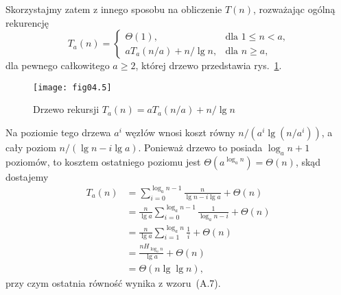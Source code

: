 Skorzystajmy zatem z innego sposobu na obliczenie $T(n)$, rozważając ogólną rekurencję
\[
	T_a(n) = \begin{cases}
		\Theta(1), & \text{dla $1\le n<a$,} \\
		aT_a(n/a)+n/\!\lg n, & \text{dla $n\ge a$,}
	\end{cases}
\]
dla pewnego całkowitego $a\ge2$, której drzewo przedstawia rys.~\ref{fig:4-4b}.
\begin{figure}[ht]
	\begin{center}
		\texttt{[image: fig04.5]}
	\end{center}
	\caption{Drzewo rekursji $T_a(n)=aT_a(n/a)+n/\!\lg n$} \label{fig:4-4b}
\end{figure}
Na  poziomie tego drzewa $a^i$ węzłów wnosi koszt równy $n/(a^i\lg(n/a^i))$, a cały poziom $n/(\lg n-i\lg a)$. Ponieważ drzewo to posiada $\log_an+1$ poziomów, to kosztem ostatniego poziomu jest $\Theta(a^{\log_an})=\Theta(n)$, skąd dostajemy
\begin{align*}
	T_a(n) &= \sum_{i=0}^{\log_an-1}\frac{n}{\lg n-i\lg a}+\Theta(n) \\
	&= \frac{n}{\lg a}\sum_{i=0}^{\log_an-1}\frac{1}{\log_an-i}+\Theta(n) \\
	&= \frac{n}{\lg a}\sum_{i=1}^{\log_an}\frac{1}{i}+\Theta(n) \\
	&= \frac{nH_{\log_an}}{\lg a}+\Theta(n) \\
	&= \Theta(n\lg\lg n),
\end{align*}
przy czym ostatnia równość wynika z wzoru~(A.7).


